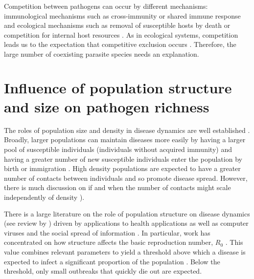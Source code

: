 Competition between pathogens can occur by different mechanisms: immunological mechanisms such as cross-immunity or shared immune response \cite{fenton2010applying} and ecological mechanisms such as removal of susceptible hosts by death \cite{rohani2003ecological} or competition for internal host resources \cite{griffiths2014analysis}.
As in ecological systems, competition leads us to the expectation that competitive exclusion occurs \cite{bremermann1989competitive, martcheva2013competitive, ackleh2003competitive, ackleh2014robust, turner2002impact}.
Therefore, the large number of coexisting parasite species needs an explanation.



\section{Influence of population structure and size on pathogen richness}




The roles of population size and density in disease dynamics are well established \cite{may1979population, anderson1979population, heesterbeek2002brief, lloyd2005should}.
Broadly, larger populations can maintain diseases more easily by having a larger pool of susceptible individuals (individuals without acquired immunity) and having a greater number of new susceptible individuals enter the population by birth or immigration \cite{may1979population, anderson1979population}.
High density populations are expected to have a greater number of contacts between individuals and so promote disease spread.
However, there is much discussion on if and when the number of contacts might scale independently of density \cite{mccallum2001should}).


There is a large literature on the role of population structure on disease dynamics (see review by \textcite{pastor2015epidemic}) driven by applications to health applications as well as computer viruses \cite{pastor2001epidemic} and the social spread of information \cite{goffman1964generalization}.
In particular, work has concentrated on how structure affects the basic reproduction number, $R_0$ \cite{colizza2007invasion, barthelemy2010fluctuation, wu2013threshold, may2001infection, pastor2001epidemic}. 
This value combines relevant parameters to yield a threshold above which a disease is expected to infect a significant proportion of the population \cite{may1979population, anderson1979population}.
Below the threshold, only small outbreaks that quickly die out are expected.


